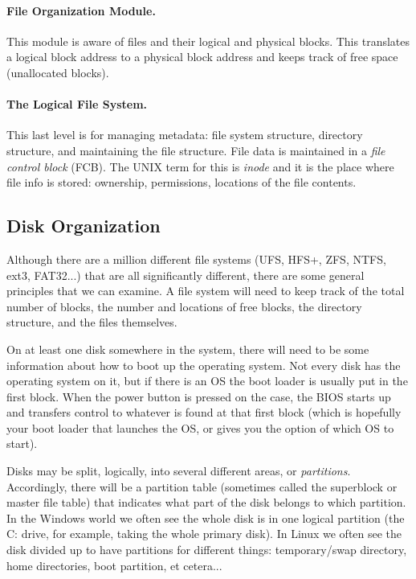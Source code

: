 \paragraph{File Organization Module.} This module is aware of files and their logical and physical blocks. This translates a logical block address to a physical block address and keeps track of free space (unallocated blocks).

\paragraph{The Logical File System.} This last level is for managing metadata: file system structure, directory structure, and maintaining the file structure. File data is maintained in a \textit{file control block} (FCB). The UNIX term for this is \textit{inode} and it is the place where file info is stored: ownership, permissions, locations of the file contents.

\subsection*{Disk Organization}

Although there are a million different file systems (UFS, HFS+, ZFS, NTFS, ext3, FAT32...) that are all significantly different, there are some general principles that we can examine. A file system will need to keep track of the total number of blocks, the number and locations of free blocks, the directory structure, and the files themselves.

On at least one disk somewhere in the system, there will need to be some information about how to boot up the operating system. Not every disk has the operating system on it, but if there is an OS the boot loader is usually put in the first block. When the power button is pressed on the case, the BIOS starts up and transfers control to whatever is found at that first block (which is hopefully your boot loader that launches the OS, or gives you the option of which OS to start).

Disks may be split, logically, into several different areas, or \textit{partitions}. Accordingly, there will be a partition table (sometimes called the superblock or master file table) that indicates what part of the disk belongs to which partition. In the Windows world we often see the whole disk is in one logical partition (the C: drive, for example, taking the whole primary disk). In Linux we often see the disk divided up to have partitions for different things: temporary/swap directory, home directories, boot partition, et cetera...

